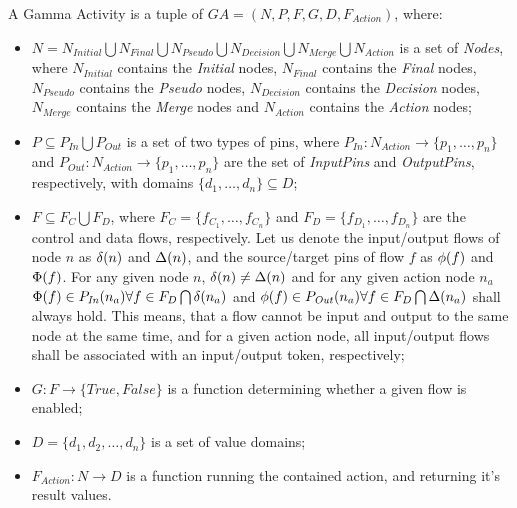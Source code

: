 \begin{definition}
	A Gamma Activity is a tuple of \(GA = (N, P, F, G, D, F_{Action})\), where:
	
	\begin{itemize}
		\item \(N = N_\mathit{Initial} \bigcup N_\mathit{Final} \bigcup N_\mathit{Pseudo} \bigcup N_\mathit{Decision} \bigcup N_\mathit{Merge} \bigcup N_\mathit{Action} \) is a set of \emph{Nodes}, where \(N_\mathit{Initial}\) contains the \emph{Initial} nodes, \(N_\mathit{Final}\) contains the \emph{Final} nodes, \(N_\mathit{Pseudo}\) contains the \emph{Pseudo} nodes, \(N_\mathit{Decision}\) contains the \emph{Decision} nodes, \(N_\mathit{Merge}\) contains the \emph{Merge} nodes and \(N_\mathit{Action}\) contains the \emph{Action} nodes;
		\item \( P \subseteq P_\mathit{In} \bigcup P_\mathit{Out} \) is a set of two types of pins, where \(P_\mathit{In} : N_\mathit{Action} \rightarrow \{ p_1, \dots, p_n \} \) and \(P_\mathit{Out} : N_\mathit{Action} \rightarrow \{ p_1, \dots, p_n \} \) are the set of \emph{InputPins} and \emph{OutputPins}, respectively, with domains \(\{ d_1, \dots, d_n \} \subseteq D \);
		\item \( F \subseteq F_C \bigcup F_D \), where \(F_C = \{ f_{C_1}, \dots, f_{C_n} \} \) and \(F_D = \{ f_{D_1}, \dots, f_{D_n} \} \) are the control and data flows, respectively. Let us denote the input/output flows of node \(n\) as \( \delta(n) \) and \( \Delta(n) \), and the source/target pins of flow \(f\) as \( \phi(f) \) and \(\Phi(f)\). For any given node \(n\), \( \delta(n) \neq \Delta(n) \) and for any given action node \(n_a\) \( \Phi(f) \in P_\mathit{In}(n_a) \forall f \in F_D \bigcap \delta(n_a) \) and \( \phi(f) \in P_\mathit{Out}(n_a) \forall f \in F_D \bigcap \Delta(n_a) \) shall always hold. This means, that a flow cannot be input and output to the same node at the same time, and for a given action node, all input/output flows shall be associated with an input/output token, respectively;
		\item \(G : F \rightarrow \{ \mathit{True}, \mathit{False} \} \) is a function determining whether a given flow is enabled;
		\item \(D = \{ d_{1}, d_{2}, \dots, d_{n} \} \) is a set of value domains;
		\item \(F_{Action} : N \rightarrow D \) is a function running the contained action, and returning it's result values.
	\end{itemize}
	

\end{definition}
